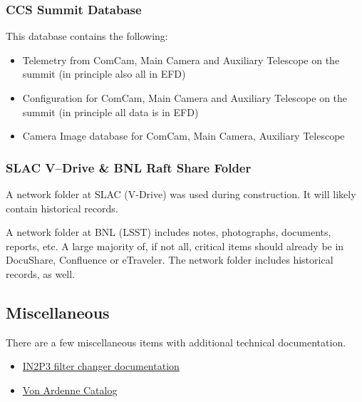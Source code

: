\subsubsection{CCS Summit Database}

This database contains the following:

\begin{itemize}
	\item Telemetry from ComCam, Main Camera and Auxiliary Telescope on the summit (in principle also all in EFD)
	\item Configuration for ComCam, Main Camera and Auxiliary Telescope on the summit (in principle all data is in EFD)
	\item Camera Image database for ComCam, Main Camera, Auxiliary Telescope
\end{itemize}

\subsubsection{SLAC V--Drive \& BNL Raft Share Folder}

A network folder at SLAC (V-Drive) was used during construction. It will likely contain historical records.

A network folder at BNL (LSST) includes notes, photographs, documents, reports, etc.
A large majority of, if not all, critical items should already be in DocuShare, Confluence or eTraveler.
The network folder includes historical records, as well.

\subsection{Miscellaneous}

There are a few miscellaneous items with additional technical documentation.

\begin{itemize}
	\item \href{https://filterchangerdoc.pages.in2p3.fr/fcs-doc/}{IN2P3 filter changer documentation}
	\item \href{https://vacatalog.vonardenne.biz/index.php/m/home/index}{Von Ardenne Catalog}
\end{itemize}
